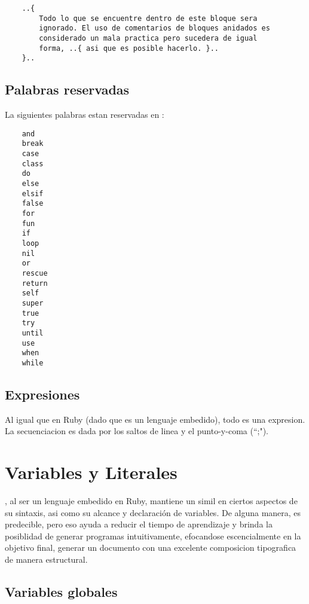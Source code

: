 \documentclass[12pt,letterpaper,titlepage,oneside,openright]{book}
\newcommand{\OhTeX}{%
    \makebox[0.76em][c]{O}%
    \makebox[0.25em][c]{%
        \raisebox{0.14em}[0em][0em]{%
            \fontsize{0.5em}{0cm}%
                \selectfont H%
        }%
    }%
    \makebox[1.35em][c]{\TeX}%
}
\newcommand{\ohtex}{\OhTeX\xspace}
\begin{document}
\begin{center}
\begin{lstlisting}
    ..{
        Todo lo que se encuentre dentro de este bloque sera
        ignorado. El uso de comentarios de bloques anidados es
        considerado un mala practica pero sucedera de igual
        forma, ..{ asi que es posible hacerlo. }..
    }..    
\end{lstlisting}
\end{center}

\subsection{Palabras reservadas}

La siguientes palabras estan reservadas en \ohtex:

\begin{center}
\begin{lstlisting}
    and
    break
    case
    class
    do
    else
    elsif
    false
    for
    fun
    if
    loop
    nil
    or
    rescue
    return
    self
    super
    true
    try
    until
    use
    when
    while
\end{lstlisting}
\end{center}

\subsection{Expresiones}

Al igual que en Ruby (dado que es un lenguaje embedido), todo es una expresion.
La secuenciacion es dada por los saltos de linea y el punto-y-coma (``;").

\section{Variables y Literales}

\ohtex, al ser un lenguaje embedido en Ruby, mantiene un simil en ciertos
aspectos de su sintaxis, asi como su alcance y declaración de variables. De
alguna manera, es predecible, pero eso ayuda a reducir el tiempo de aprendizaje
y brinda la posiblidad de generar programas intuitivamente, efocandose
escencialmente en la objetivo final, generar un documento con una excelente
composicion tipografica de manera estructural.

\subsection{Variables globales}
\end{document}

